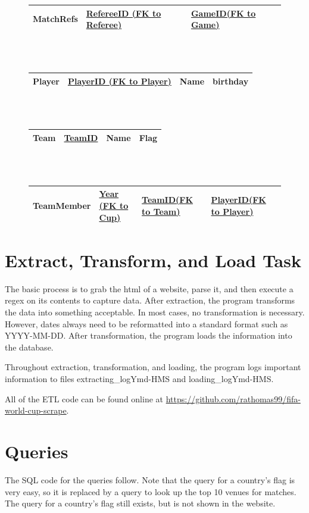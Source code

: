 \documentclass{article}
\begin{document}
\begin{figure}
\begin{tabular}{||l || l | l |}
		\hline
		MatchRefs & \textbf{\underline{RefereeID (FK to Referee)}} & \textbf{\underline{GameID(FK to Game)}} \\
		\hline
	\end{tabular}
	\\
	\\
	\begin{tabular}{||l || l | l | l |}
		\hline
		Player & \textbf{\underline{PlayerID (FK to Player)}} & Name & birthday \\
		\hline
	\end{tabular}
	\\
	\\
	\begin{tabular}{||l || l | l | l |}
		\hline
		Team & \textbf{\underline{TeamID}} & Name & Flag \\
		\hline
	\end{tabular}
	\\
	\\
	\begin{tabular}{||l || l | l | l |}
		\hline
		TeamMember & \textbf{\underline{Year (FK to Cup)}} & \textbf{\underline{TeamID(FK to Team)}} & \textbf{\underline{PlayerID(FK to Player)}} \\
		\hline
	\end{tabular}
\end{figure}


\section{Extract, Transform, and Load Task}
The basic process is to grab the html of a website, parse it, and then execute a regex on its contents to capture data. 
After extraction, the program transforms the data into something acceptable.
In most cases, no transformation is necessary. However, dates always need to
be reformatted into a standard format such as YYYY-MM-DD.
After transformation, the program loads the information into the database.

Throughout extraction, transformation, and loading, the program logs important
information to files extracting\_logYmd-HMS and loading\_logYmd-HMS.

All of the ETL code can be found online at \url{https://github.com/rathomas99/fifa-world-cup-scrape}.

\section{Queries}
The SQL code for the queries follow. Note that the query for a country's flag is very easy, so it is replaced by a query to look up the top 10 venues for matches. The query for a country's flag still exists, but is not shown in the website. 
\end{document}
